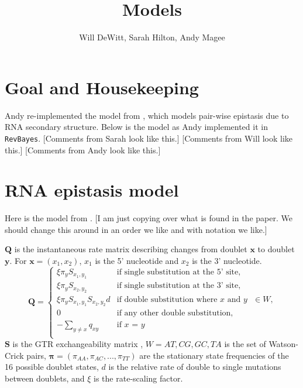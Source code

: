 \documentclass[11pt]{article}
\title{Models}
\author{Will DeWitt, Sarah Hilton, Andy Magee}
\date{}
\newcommand\skhcomment[1]{{\color{violet}[#1]}}
\newcommand\wdcomment[1]{{\color{orange}[#1]}}
\newcommand\amcomment[1]{{\color{teal}[#1]}}
\begin{document}
 
\maketitle 

\section*{Goal and Housekeeping} 

Andy re-implemented the model from \cite{nasrallah2013phylogenetic}, which models pair-wise epistasis due to RNA secondary structure. 
Below is the model as Andy implemented it in \texttt{RevBayes}. 
\skhcomment{Comments from Sarah look like this.}
\wdcomment{Comments from Will look like this.}
\amcomment{Comments from Andy look like this.}

\section*{RNA epistasis model}

Here is the model from \cite{nasrallah2013phylogenetic}. 
\skhcomment{I am just copying over what is found in the paper. We should change this around in an order we like and with notation we like.}

$\boldsymbol{Q}$ is the instantaneous rate matrix describing changes from doublet $\boldsymbol{x}$ to doublet $\boldsymbol{y}$.  
For $\boldsymbol{x} = (x_1, x_2)$, $x_1$ is the 5' nucleotide and $x_2$ is the 3' nucleotide. 
\begin{equation}
\label{eq:Q}
\boldsymbol{Q} = 
\begin{cases}
   \xi \pi_y S_{x_1, y_1} & \mbox{if single substitution at the 5' site,} \\
   \xi \pi_y S_{x_2, y_2} & \mbox{if single substitution at the 3' site,} \\
   \xi \pi_y S_{x_1, y_1} S_{x_2, y_2} d & \mbox{if double substitution where $x$ and $y$ $\in W$,} \\
   0 & \mbox{if any other double substitution,} \\
   - \sum_{y \ne x} q_{xy}& \mbox{if $x$ = $y$} \\
   \end{cases}
\end{equation}
$\boldsymbol{S}$ is the GTR exchangeability matrix \citep{tavare1986some},  
$W = {AT, CG, GC, TA}$ is the set of Watson-Crick pairs, 
$\boldsymbol{\pi} = (\pi_{AA}, \pi_{AC}, ..., \pi_{TT})$ are the stationary state frequencies of the 16 possible doublet states, 
$d$ is the relative rate of double to single mutations between doublets, 
and $\xi$ is the rate-scaling factor. 
\end{document}
